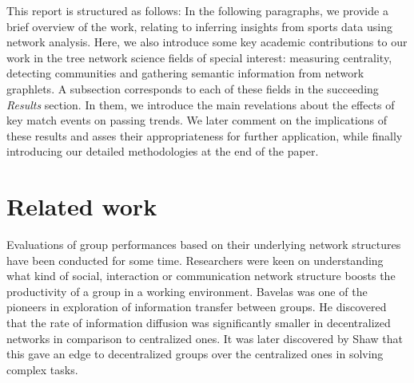\documentclass[9pt,twocolumn,twoside]{pnas-report}
\begin{document}
This report is structured as follows: In the following paragraphs, we provide a brief overview of the work, relating to inferring insights from sports data using network analysis. Here, we also introduce some key academic contributions to our work in the tree network science fields of special interest: measuring centrality, detecting communities and gathering semantic information from network graphlets. A subsection corresponds to each of these fields in the succeeding \textit{Results} section. In them, we introduce the main revelations about the effects of key match events on passing trends. We later comment on the implications of these results and asses their appropriateness for further application, while finally introducing our detailed methodologies at the end of the paper.




\section*{Related work}
Evaluations of group performances based on their underlying network structures have been conducted for some time. Researchers were keen on understanding what kind of social, interaction or communication network structure boosts the productivity of a group in a working environment. Bavelas \cite{bavelas} was one of the pioneers in exploration of information transfer between groups. He discovered that the rate of information diffusion was significantly smaller in decentralized networks in comparison to centralized ones. It was later discovered by Shaw \cite{shaw} that this gave an edge to decentralized groups over the centralized ones in solving complex tasks. \
\end{document}
